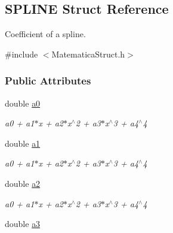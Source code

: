 \hypertarget{structSPLINE}{}\subsection{S\+P\+L\+I\+NE Struct Reference}
\label{structSPLINE}


Coefficient of a spline.  




{\ttfamily \#include $<$Matematica\+Struct.\+h$>$}

\subsubsection*{Public Attributes}
\begin{DoxyCompactItemize}
\item 
double \hyperlink{structSPLINE_ad95dcba445836b4ba94129111a4b888c}{a0}\hypertarget{structSPLINE_ad95dcba445836b4ba94129111a4b888c}{}\label{structSPLINE_ad95dcba445836b4ba94129111a4b888c}

\begin{DoxyCompactList}\small\item\em a0 + a1$\ast$x + a2$\ast$x$^\wedge$2 + a3$\ast$x$^\wedge$3 + a4$^\wedge$4 \end{DoxyCompactList}\item 
double \hyperlink{structSPLINE_a5d015a3751aec61f2442b957cb6f517a}{a1}\hypertarget{structSPLINE_a5d015a3751aec61f2442b957cb6f517a}{}\label{structSPLINE_a5d015a3751aec61f2442b957cb6f517a}

\begin{DoxyCompactList}\small\item\em a0 + a1$\ast$x + a2$\ast$x$^\wedge$2 + a3$\ast$x$^\wedge$3 + a4$^\wedge$4 \end{DoxyCompactList}\item 
double \hyperlink{structSPLINE_ac55c2d269ed76bd9bdb7fb25f3533a4e}{a2}\hypertarget{structSPLINE_ac55c2d269ed76bd9bdb7fb25f3533a4e}{}\label{structSPLINE_ac55c2d269ed76bd9bdb7fb25f3533a4e}

\begin{DoxyCompactList}\small\item\em a0 + a1$\ast$x + a2$\ast$x$^\wedge$2 + a3$\ast$x$^\wedge$3 + a4$^\wedge$4 \end{DoxyCompactList}\item 
double \hyperlink{structSPLINE_aac922a785af4fb14fc828152cd94c34e}{a3}\hypertarget{structSPLINE_aac922a785af4fb14fc828152cd94c34e}{}\label{structSPLINE_aac922a785af4fb14fc828152cd94c34e}


\end{DoxyCompactItemize}
